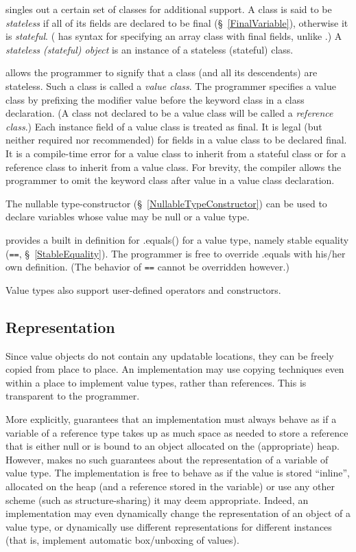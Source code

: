 {}\Xten{} singles out a certain set of classes for additional
support. A class is said to be {\em stateless} if all of its fields
are declared to be {\cf final} (\S~\ref{FinalVariable}), otherwise it
is {\em stateful}. (\Xten{} has syntax for specifying an array class
with final fields, unlike \java{}.) A {\em stateless (stateful)
object} is an instance of a stateless (stateful) class.

{}\Xten{} allows the programmer to signify that a class (and all its
descendents) are stateless. Such a class is called a {\em value
class}.  The programmer specifies a value class by prefixing the
modifier {\cf value} before the keyword {\cf class} in a class
declaration.  (A class not declared to be a value class will be called
a {\em reference class}.)  Each instance field of a value class is
treated as {\cf final}. It is legal (but neither required nor recommended)
for fields in a value class to be declared final. It is a compile-time
error for a value class to inherit from a stateful class or for a
reference class to inherit from a value class. For brevity, the \Xten{}
compiler allows the programmer to omit the keyword class after value
in a value class declaration.

The {\cf nullable} type-constructor (\S~\ref{NullableTypeConstructor}) can
be used to declare variables whose value may be {\cf null} or a value
type.

{}\Xten{} provides a built in definition for {\cf .equals()} for a
value type, namely stable equality ({\tt ==},
\S~\ref{StableEquality}). The programmer is free to override {\cf
.equals} with his/her own definition. (The behavior of {\tt ==} cannot
be overridden however.)

Value types also support user-defined operators and constructors. 

\subsection{Representation}

Since value objects do not contain any updatable locations, they can
be freely copied from place to place. An implementation may use
copying techniques even within a place to implement value types,
rather than references. This is transparent to the programmer.

More explicitly, \Xten{} guarantees that an implementation must always
behave as if a variable of a reference type takes up as much space as
needed to store a reference that is either null or is bound to an
object allocated on the (appropriate) heap. However, \Xten{} makes no
such guarantees about the representation of a variable of value
type. The implementation is free to behave as if the value is stored
``inline'', allocated on the heap (and a reference stored in the
variable) or use any other scheme (such as structure-sharing) it may
deem appropriate. Indeed, an implementation may even dynamically
change the representation of an object of a value type, or dynamically
use different representations for different instances (that is,
implement automatic box/unboxing of values).

